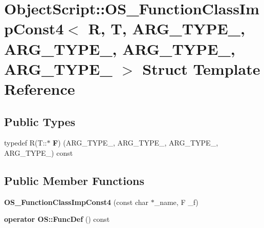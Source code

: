 \hypertarget{struct_object_script_1_1_o_s___function_class_imp_const4}{}\section{Object\+Script\+:\+:O\+S\+\_\+\+Function\+Class\+Imp\+Const4$<$ R, T, A\+R\+G\+\_\+\+T\+Y\+P\+E\+\_, A\+R\+G\+\_\+\+T\+Y\+P\+E\+\_, A\+R\+G\+\_\+\+T\+Y\+P\+E\+\_, A\+R\+G\+\_\+\+T\+Y\+P\+E\+\_ $>$ Struct Template Reference}
\label{struct_object_script_1_1_o_s___function_class_imp_const4}
\subsection*{Public Types}
\begin{DoxyCompactItemize}
\item 
typedef R(T\+::$\ast$ {\bfseries F}) (A\+R\+G\+\_\+\+T\+Y\+P\+E\+\_, A\+R\+G\+\_\+\+T\+Y\+P\+E\+\_, A\+R\+G\+\_\+\+T\+Y\+P\+E\+\_, A\+R\+G\+\_\+\+T\+Y\+P\+E\+\_) const \hypertarget{struct_object_script_1_1_o_s___function_class_imp_const4_a86825c153a9e0ba9cbc3ac2a6df55896}{}\label{struct_object_script_1_1_o_s___function_class_imp_const4_a86825c153a9e0ba9cbc3ac2a6df55896}

\end{DoxyCompactItemize}
\subsection*{Public Member Functions}
\begin{DoxyCompactItemize}
\item 
{\bfseries O\+S\+\_\+\+Function\+Class\+Imp\+Const4} (const char $\ast$\+\_\+name, F \+\_\+f)\hypertarget{struct_object_script_1_1_o_s___function_class_imp_const4_a6e4e204f6e7f0c4325a1d8ab6083a692}{}\label{struct_object_script_1_1_o_s___function_class_imp_const4_a6e4e204f6e7f0c4325a1d8ab6083a692}

\item 
{\bfseries operator O\+S\+::\+Func\+Def} () const \hypertarget{struct_object_script_1_1_o_s___function_class_imp_const4_ab73d2999cf4ead19bb913ba5b6a69813}{}\label{struct_object_script_1_1_o_s___function_class_imp_const4_ab73d2999cf4ead19bb913ba5b6a69813}

\end{DoxyCompactItemize}
